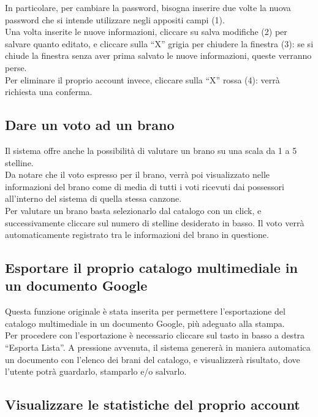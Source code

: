 In particolare, per cambiare la password, bisogna inserire due volte la nuova
password che si intende utilizzare negli appositi campi (1).\\

Una volta inserite le nuove informazioni, cliccare su salva modifiche (2) per
salvare quanto editato, e cliccare sulla ``X'' grigia per chiudere la finestra
(3): se si chiude la finestra senza aver prima salvato le nuove informazioni,
queste verranno perse.\\

Per eliminare il proprio account invece, cliccare sulla ``X'' rossa (4): verr\`a
richiesta una conferma.

\subsection{Dare un voto ad un brano}
\label{cap:voto}
Il sistema  offre anche la possibilit\`a di valutare un brano su una
scala da 1 a 5 stelline.\\
Da notare che il voto espresso per il brano, verr\`a poi visualizzato nelle
informazioni del brano come di media di tutti i voti ricevuti dai
possessori all'interno del sistema  di quella stessa canzone.\\
Per valutare un brano basta selezionarlo dal catalogo con un click, e
successivamente cliccare sul numero di stelline desiderato in basso. Il voto
verr\`a automaticamente registrato tra le informazioni del brano in questione.

\subsection{Esportare il proprio catalogo multimediale in un documento Google}

Questa funzione originale \`e stata inserita per permettere l'esportazione del
catalogo multimediale in un documento Google, pi\`u adeguato alla stampa.\\
Per procedere con l'esportazione \`e necessario cliccare sul tasto in
basso a destra ``Esporta Lista''. A pressione avvenuta, il sistema generer\`a
in maniera automatica un documento con l'elenco dei brani del catalogo, e
visualizzer\`a risultato, dove l'utente potr\`a guardarlo, stamparlo e/o salvarlo.

\subsection{Visualizzare le statistiche del proprio account}

